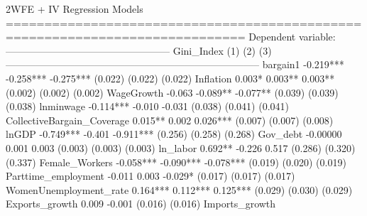 2WFE + IV Regression Models =============================================================================                                           Dependent variable:                                            --------------------------------------------------                                                Gini_Index                                                      (1)              (2)              (3)        ----------------------------------------------------------------------------- bargain1                      -0.219***        -0.258***        -0.275***                                    (0.022)          (0.022)          (0.022)                                                                                    Inflation                       0.003*          0.003**          0.003**                                     (0.002)          (0.002)          (0.002)                                                                                    WageGrowth                      -0.063          -0.089**         -0.077**                                    (0.039)          (0.039)          (0.038)                                                                                    lnminwage                     -0.114***          -0.010           -0.031                                     (0.038)          (0.041)          (0.041)                                                                                    CollectiveBargain_Coverage     0.015**           0.002           0.026***                                    (0.007)          (0.007)          (0.008)                                                                                    lnGDP                         -0.749***          -0.401         -0.911***                                    (0.256)          (0.258)          (0.268)                                                                                    Gov_debt                       -0.00000          0.001            0.003                                      (0.003)          (0.003)          (0.003)                                                                                    ln_labor                       0.692**           -0.226           0.517                                      (0.286)          (0.320)          (0.337)                                                                                    Female_Workers                -0.058***        -0.090***        -0.078***                                    (0.019)          (0.020)          (0.019)                                                                                    Parttime_employment             -0.011           0.003           -0.029*                                     (0.017)          (0.017)          (0.017)                                                                                    WomenUnemployment_rate         0.164***         0.112***         0.125***                                    (0.029)          (0.030)          (0.029)                                                                                    Exports_growth                                   0.009            -0.001                                                      (0.016)          (0.016)                                                                                    Imports_growth                 